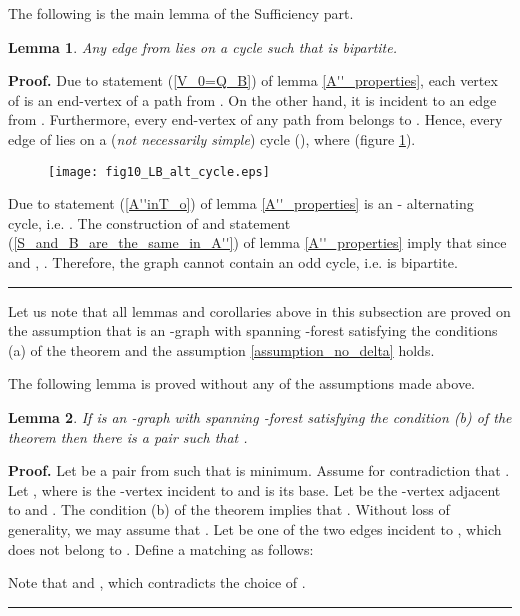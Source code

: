 \documentclass[a4paper, 12pt]{article}
\newtheorem{lemma}{Lemma}[subsection]
\newenvironment{proof}[1][Proof]{\noindent\textbf{#1.} }{\ \rule{0.5em}{0.5em}}
\begin{document}
The following is the main lemma of the Sufficiency part.
\begin{lemma}\label{LB_alt_cycles}
Any edge from  lies on a cycle  such
that  is bipartite.
\end{lemma}
\begin{proof}
Due to statement (\ref{V_0=Q_B}) of lemma \ref{A''_properties}, each
vertex of  is an end-vertex of a path from . On the other
hand, it is incident to an edge from . Furthermore, every
end-vertex of any path from  belongs to . Hence, every
edge of  lies on a ({\em not necessarily simple}) cycle  (), where  (figure \ref{fig_LB_alt_cycle}).

\begin{figure}[h]
\begin{center}
\texttt{[image: fig10\_LB\_alt\_cycle.eps]}\\
\caption{}\label{fig_LB_alt_cycle}
\end{center}
\end{figure}

Due to statement (\ref{A''inT_o}) of lemma \ref{A''_properties} 
is an - alternating cycle, i.e. . The construction of  and statement
(\ref{S_and_B_are_the_same_in_A''}) of lemma \ref{A''_properties}
imply that  since 
and , . Therefore,
the graph  cannot contain an odd cycle, i.e. is
bipartite.
\end{proof}

\bigskip

Let us note that all lemmas and corollaries above in this subsection
are proved on the assumption that  is an -graph with spanning
-forest  satisfying the conditions (a) of the theorem and the
assumption \ref{assumption_no_delta} holds.

\bigskip

The following lemma is proved without any of the assumptions made
above.
\begin{lemma} \label{no_delta}
If  is an -graph with spanning -forest  satisfying the
condition (b) of the theorem then there is a pair  such that .
\end{lemma}
\begin{proof}
Let  be a pair from  such that  is minimum. Assume for contradiction that . Let , where  is the -vertex incident to  and
 is its base. Let  be the -vertex adjacent to  and .
The condition (b) of the theorem implies that . Without loss of generality, we may assume that . Let  be one of the two edges incident to , which does not
belong to . Define a matching  as follows:

Note that  and , which
contradicts the choice of .
\end{proof}
\end{document}
